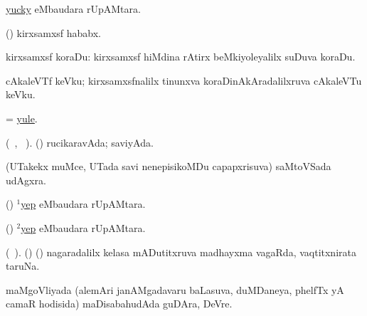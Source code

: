 \bentry
{} 
\gl{\gu} 
\bmng
\hyperlink{yucky}{yucky}  eMbaudara rUpAMtara.
\emng
\eentry

\bentry
{} 
\gl{\nA} 
\bmng
(\pArxparx)  kirxsamxsf hababx.
\emng
\eentry

\bentry
{} 
\gl{\nA} 
\bmng
kirxsamxsf koraDu: 
\banum
{}  kirxsamxsf hiMdina rAtirx beMkiyoleyalilx suDuva koraDu. 

 cAkaleVTf keVku; kirxsamxsfnalilx tinunxva koraDinAkAradalilxruva  cAkaleVTu keVku.
\eanum
\emng 
\eentry

\bentry
{} 
\gl{\nA} 
\bmng
= \hyperlink{yule}{yule}.
\emng
\eentry

\bentry
{} 
\gl{\gu} 
\bmng
(\tara\ , \tama\ ).
(\AmA) rucikaravAda; saviyAda.
\emng
\eentry

\bentry
{} 
\gl{\BAavayx} 
\bmng
(UTakekx muMce, UTada  savi nenepisikoMDu capapxrisuva) saMtoVSada udAgxra.
\emng
\eentry

\bentry
{} 
\gl{\kirxvi} 
\bmng
(\ame) \hyperlink{yep(1)}{$^1$yep} eMbaudara rUpAMtara.
\emng
\eentry

\bentry
{} 
\gl{\nA}
\bmng
(\ame) \hyperlink{yep(2)}{$^2$yep} eMbaudara rUpAMtara.
\emng
\eentry

\bentry
{} 
\gl{\nA} 
\bmng
(\bava\ ). 
(\AmA) (\hiV) nagaradalilx kelasa mADutitxruva madhayxma vagaRda, vaqtitxnirata taruNa.
\emng
\eentry

\bentry
{} 
\gl{\nA} 
\bmng
maMgoVliyada (alemAri janAMgadavaru baLasuva, duMDaneya, phelfTx yA camaR hodisida) maDisabahudAda guDAra, DeVre.
\emng 
\eentry

\bentry
{}
\gl{\saMkiSx} 
\bmng
{}
\emng
\eentry


%

